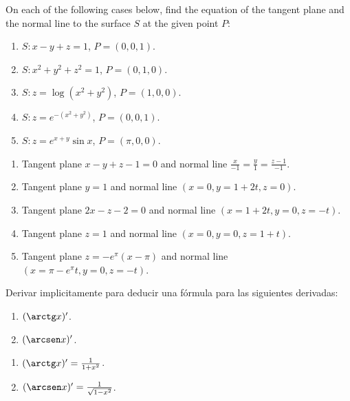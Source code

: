{On each of the following cases below, find the equation of the tangent plane and the normal line to the surface $S$ at the given point
$P$:
\begin{enumerate}
\item $S:x-y+z=1$, $P=(0,0,1)$.
\item $S:x^2+y^2+z^2=1$, $P=(0,1,0)$.
\item $S:z=\log(x^2+y^2)$, $P=(1,0,0)$.
\item $S:z=e^{-(x^2+y^2)}$, $P=(0,0,1)$.
\item $S:z=e^{x+y}\sin x$, $P=(\pi,0,0)$.
\end{enumerate}
}
{\begin{enumerate}
\item Tangent plane $x-y+z-1=0$ and normal line $\frac{x}{-1}=\frac{y}{1}=\frac{z-1}{-1}$.
\item Tangent plane $y=1$ and normal line $(x=0, y=1+2t, z=0)$.
\item Tangent plane $2x-z-2=0$ and normal line $(x=1+2t, y=0, z=-t)$.
\item Tangent plane $z=1$ and normal line $(x=0, y=0, z=1+t)$.
\item Tangent plane $z=-e^\pi(x-\pi)$ and normal line $(x=\pi-e^\pi t, y=0, z=-t)$.
\end{enumerate}
}
{
}


{Derivar implicitamente para deducir una fórmula para las siguientes derivadas:
\begin{enumerate}
\item $(\arctg x)'$.
\item $(\arcsen x)'$.
\end{enumerate}
}
{\begin{enumerate}
\item $(\arctg x)'=\frac{1}{1+x^2}$.
\item $(\arcsen x)' = \frac{1}{\sqrt{1-x^2}}$.
\end{enumerate}
}
{
}
